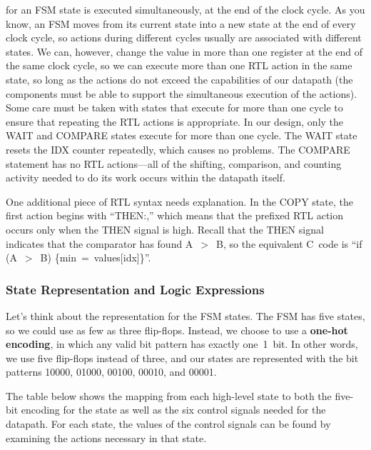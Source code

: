 for an FSM state is executed
simultaneously, at the end of the clock cycle.  As you know, an FSM moves 
from its current state into a new state at the end of every clock cycle,
so actions during different cycles usually are associated with different 
states.
We can, however, change the value in more than one register at the end 
of the same clock cycle, so we can execute more than one RTL action in
the same state, so long as the actions do not exceed the capabilities
of our datapath (the components must be able to support the simultaneous 
execution of the actions).  Some care must be taken with states that 
execute for more than one cycle to ensure that repeating the 
RTL actions is appropriate.  In our design, only the {\tfix WAIT} and
{\tfix COMPARE} states execute for more than one cycle.  The {\tfix WAIT}
state resets the {\tfix IDX} counter repeatedly, which causes no problems.
The {\tfix COMPARE} statement has no RTL actions---all of the shifting,
comparison, and counting activity needed to do its work occurs within 
the datapath itself.

One additional piece of RTL syntax needs explanation.  In the {\tfix COPY}
state, the first action begins with ``{\tfix THEN}:,'' which means that the 
prefixed RTL action occurs only when the {\tfix THEN} signal is high.
Recall that the {\tfix THEN} signal indicates that the comparator has
found {\tfix A~$>$~B}, so the equivalent C~code is ``{\tfix if (A~$>$~B) 
\{min~=~values[idx]\}}''.\\

\subsubsection{State Representation and Logic Expressions}

Let's think about the representation for the FSM states.  The FSM has 
five states, so we could use as few as three flip-flops.  Instead, we choose
to use a {\bf one-hot encoding}, in which any valid bit pattern has exactly
one~1~bit.  In other words, we use five flip-flops instead of three,
and our states are represented with the bit patterns 10000, 01000, 00100,
00010, and 00001.

The table below shows the mapping from each high-level state to 
both the five-bit encoding for the state as well as the six control signals 
needed for the datapath.  For each state, the values of the control signals
can be found by examining the actions necessary in that state.\\

